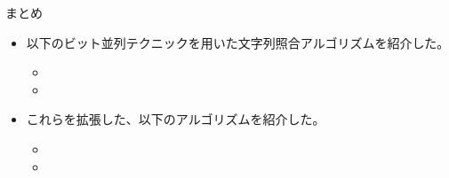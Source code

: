 \documentclass[dvipdfmx,12pt,beamer]{standalone}
\begin{document}
\begin{frame}{まとめ}
	\begin{itemize}
		\item 以下のビット並列テクニックを用いた文字列照合アルゴリズムを紹介した。
			\begin{itemize}
				\item \ShiftAnd
				\item \BNDM
			\end{itemize}
		\item これらを拡張した、以下のアルゴリズムを紹介した。
			\begin{itemize}
				\item \ExShiftAnd
				\item \ExBNDM
			\end{itemize}
	\end{itemize}

\end{frame}
\end{document}
